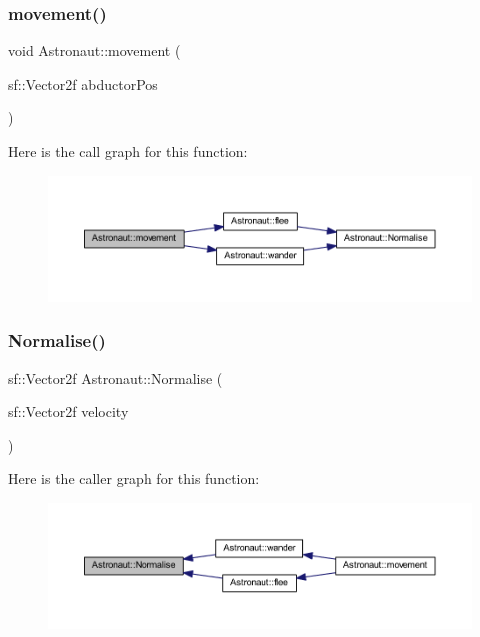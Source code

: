 \mbox{\label{class_astronaut_ab5c332ef51826c5ef2f89fcc72160401}} 
\subsubsection{\texorpdfstring{movement()}{movement()}}
{\footnotesize\ttfamily void Astronaut\+::movement (\begin{DoxyParamCaption}\item[{sf\+::\+Vector2f}]{abductor\+Pos }\end{DoxyParamCaption})}

Here is the call graph for this function\+:
\nopagebreak
\begin{figure}[H]
\begin{center}
\leavevmode
\includegraphics[width=350pt]{class_astronaut_ab5c332ef51826c5ef2f89fcc72160401_cgraph}
\end{center}
\end{figure}
\mbox{\label{class_astronaut_a9276590bb221f7809f17ebff0a32db36}} 
\subsubsection{\texorpdfstring{Normalise()}{Normalise()}}
{\footnotesize\ttfamily sf\+::\+Vector2f Astronaut\+::\+Normalise (\begin{DoxyParamCaption}\item[{sf\+::\+Vector2f}]{velocity }\end{DoxyParamCaption})}

Here is the caller graph for this function\+:
\nopagebreak
\begin{figure}[H]
\begin{center}
\leavevmode
\includegraphics[width=350pt]{class_astronaut_a9276590bb221f7809f17ebff0a32db36_icgraph}
\end{center}
\end{figure}
\mbox{\label{class_astronaut_a07d0b1366726e708be3361795a25a1ce}} 
